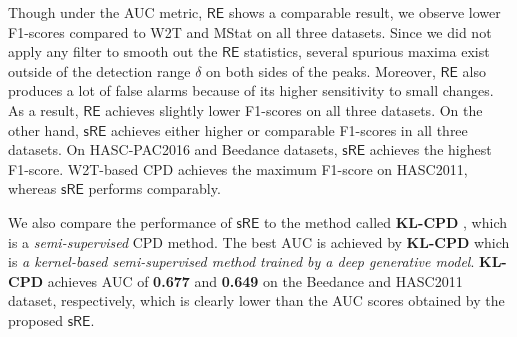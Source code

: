 \documentclass{article}
\begin{document}
Though under the AUC metric, {\small$\mathsf{RE}$} shows a comparable result, we observe lower F1-scores compared to W2T and MStat on all three datasets. Since we did not apply any filter to smooth out the {\small$\mathsf{RE}$} statistics, several spurious maxima exist outside of the detection range $\delta$ on both sides of the peaks. Moreover, {\small$\mathsf{RE}$} also produces a lot of false alarms because of its higher sensitivity to small changes. As a result, {\small$\mathsf{RE}$} achieves slightly lower F1-scores on all three datasets. On the other hand, {\small$\mathsf{sRE}$} achieves either higher or comparable F1-scores in all three datasets. On HASC-PAC2016 and Beedance datasets, {\small$\mathsf{sRE}$} achieves the highest F1-score. W2T-based CPD achieves the maximum F1-score on HASC2011, whereas {\small$\mathsf{sRE}$}  performs comparably.

We also compare the performance of {\small $\mathsf{sRE}$} to the method called \textbf{KL-CPD} \cite{chang2019kernel}, which is a \textit{semi-supervised} CPD method. The best AUC is achieved by \textbf{KL-CPD} which is \textit{a kernel-based semi-supervised method trained by a deep generative model}. \textbf{KL-CPD} achieves AUC of \textbf{0.677} and \textbf{0.649} on the Beedance and HASC2011 dataset, respectively, which is clearly lower than the AUC scores obtained by the proposed {\small $\mathsf{sRE}$}.


\end{document}
